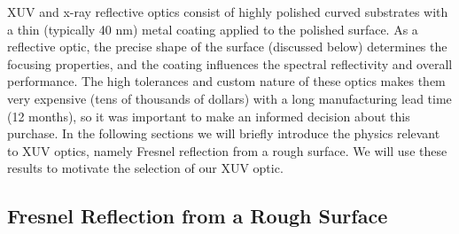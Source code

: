 XUV and x-ray reflective optics consist of highly polished curved substrates with a thin (typically 40 nm) metal coating applied to the polished surface. As a reflective optic, the precise shape of the surface (discussed below) determines the focusing properties, and the coating influences the spectral reflectivity and overall performance. The high tolerances and custom nature of these optics makes them very expensive (tens of thousands of dollars) with a long manufacturing lead time (12 months), so it was important to make an informed decision about this purchase. In the following sections we will briefly introduce the physics relevant to XUV optics, namely Fresnel reflection from a rough surface. We will use these results to motivate the selection of our XUV optic.

\subsection{Fresnel Reflection from a Rough Surface}

